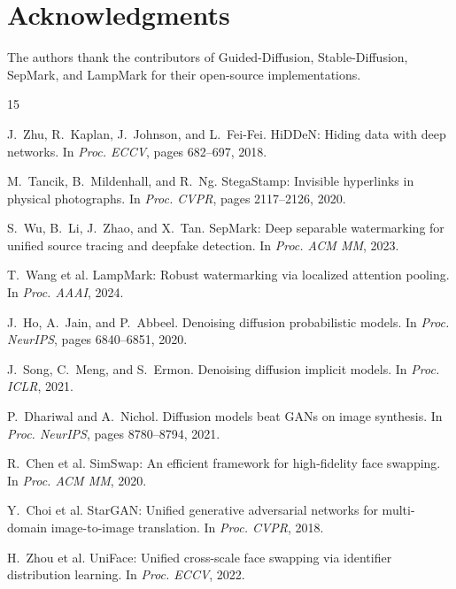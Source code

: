 \documentclass{article}
\begin{document}
\section*{Acknowledgments} The authors thank the contributors of Guided-Diffusion, Stable-Diffusion, SepMark, and LampMark for their open-source implementations.


\begin{thebibliography}{15}

J.~Zhu, R.~Kaplan, J.~Johnson, and L.~Fei-Fei.
\newblock HiDDeN: Hiding data with deep networks.
\newblock In \textit{Proc. ECCV}, pages 682--697, 2018.

M.~Tancik, B.~Mildenhall, and R.~Ng.
\newblock StegaStamp: Invisible hyperlinks in physical photographs.
\newblock In \textit{Proc. CVPR}, pages 2117--2126, 2020.

S.~Wu, B.~Li, J.~Zhao, and X.~Tan.
\newblock SepMark: Deep separable watermarking for unified source tracing and deepfake detection.
\newblock In \textit{Proc. ACM MM}, 2023.

T.~Wang et al.
\newblock LampMark: Robust watermarking via localized attention pooling.
\newblock In \textit{Proc. AAAI}, 2024.

J.~Ho, A.~Jain, and P.~Abbeel.
\newblock Denoising diffusion probabilistic models.
\newblock In \textit{Proc. NeurIPS}, pages 6840--6851, 2020.

J.~Song, C.~Meng, and S.~Ermon.
\newblock Denoising diffusion implicit models.
\newblock In \textit{Proc. ICLR}, 2021.

P.~Dhariwal and A.~Nichol.
\newblock Diffusion models beat GANs on image synthesis.
\newblock In \textit{Proc. NeurIPS}, pages 8780--8794, 2021.

R.~Chen et al.
\newblock SimSwap: An efficient framework for high-fidelity face swapping.
\newblock In \textit{Proc. ACM MM}, 2020.

Y.~Choi et al.
\newblock StarGAN: Unified generative adversarial networks for multi-domain image-to-image translation.
\newblock In \textit{Proc. CVPR}, 2018.

H.~Zhou et al.
\newblock UniFace: Unified cross-scale face swapping via identifier distribution learning.
\newblock In \textit{Proc. ECCV}, 2022.


\end{thebibliography}
\end{document}
